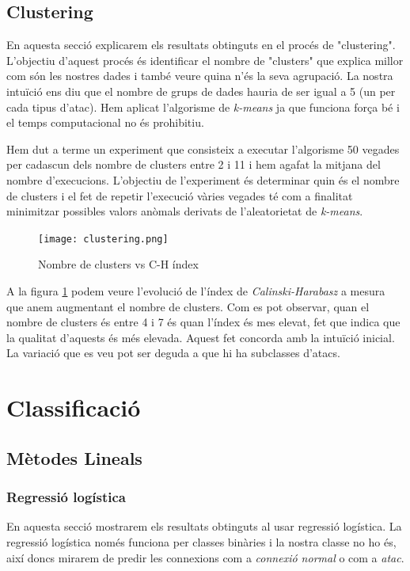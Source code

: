 \documentclass[a4paper]{article} %
\begin{document}
\subsection{Clustering}
En aquesta secció explicarem els resultats obtinguts en el procés de "clustering".
L'objectiu d'aquest procés és identificar el nombre de "clusters" que explica millor com són les nostres dades i també veure quina n'és la seva agrupació.
La nostra intuïció ens diu que el nombre de grups de dades hauria de ser igual a 5 (un per cada tipus d'atac).
Hem aplicat l'algorisme de \textit{k-means} ja que funciona força bé i el temps computacional no és prohibitiu.

Hem dut a terme un experiment que consisteix a executar l'algorisme 50 vegades per cadascun dels nombre de clusters entre 2 i 11 i hem agafat la mitjana del nombre d'execucions. L'objectiu de l'experiment és determinar quin és el nombre de clusters i el fet de repetir l'execució vàries vegades té com a finalitat minimitzar possibles valors anòmals derivats de l'aleatorietat de \textit{k-means}.

\begin{figure}[H]
	\centering
	\texttt{[image: clustering.png]}
	\caption{Nombre de clusters vs C-H índex}
	\label{fig:clust}
\end{figure}

A la figura \ref{fig:clust} podem veure l'evolució de l'índex de \textit{Calinski-Harabasz} a mesura que anem augmentant el nombre de clusters. Com es pot observar, quan el nombre de clusters és entre 4 i 7 és quan l'índex és mes elevat, fet que indica que la qualitat d'aquests és més elevada. Aquest fet concorda amb la intuïció inicial. La variació que es veu pot ser deguda a que hi ha subclasses d'atacs.




\section{Classificació}
\subsection{Mètodes Lineals}
\subsubsection{Regressió logística}
En aquesta secció mostrarem els resultats obtinguts al usar regressió logística.
La regressió logística només funciona per classes binàries i la nostra classe no ho és, així doncs mirarem de predir les connexions com a \textit{connexió normal} o com a \textit{atac}.
\end{document}
